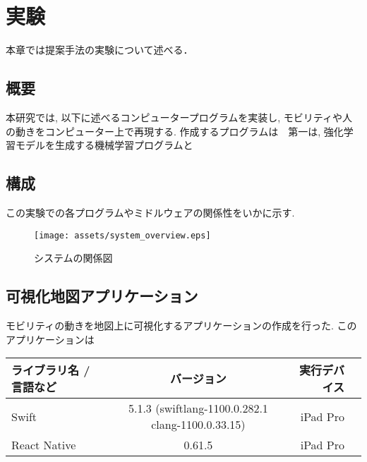 \chapter{実験}
\label{implementation}

本章では提案手法の実験について述べる．

\section{概要}

本研究では, 以下に述べるコンピュータープログラムを実装し, モビリティや人の動きをコンピューター上で再現する.
作成するプログラムは　第一は, 強化学習モデルを生成する機械学習プログラムと

\section{構成}

この実験での各プログラムやミドルウェアの関係性をいかに示す.


\begin{figure}[H]
  \centering  %
  \texttt{[image: assets/system\_overview.eps]}
  \caption{システムの関係図}  \label{sample}
\end{figure}

  

\section{可視化地図アプリケーション}

モビリティの動きを地図上に可視化するアプリケーションの作成を行った. このアプリケーションは

\begin{table}[htb]
    \centering
    \begin{tabular}{|l|c|r||r|} \hline 
      ライブラリ名 / 言語など & バージョン & 実行デバイス \\ \hline \hline
      Swift & 5.1.3 (swiftlang-1100.0.282.1 clang-1100.0.33.15) & iPad Pro \\ \hline
      React Native & 0.61.5 & iPad Pro  \\ \hline
    \end{tabular}
\end{table}


